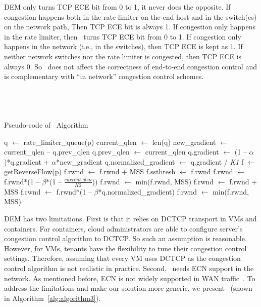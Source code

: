 DEM only turns TCP ECE bit from 0 to 1, it never does the opposite. 
If congestion happens both in the rate 
limiter on the end-host and in the switch(es) on the network path, Then TCP ECE bit is always 1. 
If congestion only happens
in the rate limiter, then~\dem{} turns TCP ECE bit from 0 to 1. 
If congestion only happens in the network (i.e., in the switches), then TCP ECE is kept as 1.
If neither network switches nor the rate limiter is congested, then TCP ECE is always 0.
So~\dem{} does not affect the correctness of end-to-end
congestion control and is complementary with ``in network'' congestion control schemes.

\subsection{~\spring{}}

\begin{algorithm}[!t]
\caption{Pseudo-code of~\spring{} Algorithm}
\label{alg:algorithm3}
\begin{algorithmic}[1]
\STATE q $\leftarrow$ rate\_limiter\_queue(p)
\STATE current\_qlen $\leftarrow$ len(q)
\STATE new\_gradient $\leftarrow$ current\_qlen -- q.prev\_qlen
\STATE q.prev\_qlen $\leftarrow$ current\_qlen
\STATE q.gradient $\leftarrow$ (1 -- $\alpha$)*q.gradient + $\alpha$*new\_gradient
\STATE q.normalized\_gradient $\leftarrow$ q.gradient / {\emph {K1}}
\STATE f $\leftarrow$ getReverseFlow(p)
\STATE f.rwnd $\leftarrow$ f.rwnd + MSS
\STATE f.ssthresh $\leftarrow$ f.rwnd
\STATE f.rwnd $\leftarrow$ f.rwnd*(1 -- $\beta$*(1 -- $\frac{current\_qlen}{K2}$))
\STATE f.rwnd $\leftarrow$ min(f.rwnd, MSS)
\STATE f.rwnd $\leftarrow$ f.rwnd + MSS
\ELSE
\STATE f.rwnd $\leftarrow$ f.rwnd*(1 -- $\beta$*q.normalized\_gradient)
\STATE f.rwnd $\leftarrow$ min(f.rwnd, MSS)
\ENDIF
\ENDIF
\ENDFOR
\end{algorithmic}
\end{algorithm}

DEM has two limitations. First is that it relies on 
DCTCP transport in VMs and containers. For containers, cloud administrators are able to configure
server's congestion control algorithm to DCTCP. So such an assumption is reasonable. 
However, for VMs, tenants have the flexibility to tune their congestion control settings.
Therefore, assuming that every VM uses DCTCP as the congestion control algorithm is not realistic in practice.
Second,~\dem{} needs ECN support in the network. As mentioned before, 
ECN is not widely supported in WAN traffic~\cite{kuhlewind2013state}.
To address the limitations and make our solution more generic, we present~\spring{} (shown in Algorithm~\ref{alg:algorithm3}).


